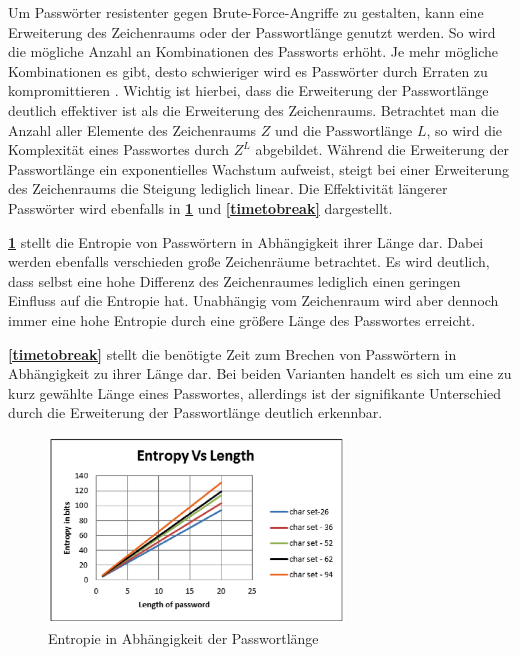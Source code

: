     Um Passwörter resistenter gegen Brute-Force-Angriffe zu gestalten, kann eine Erweiterung des Zeichenraums oder der Passwortlänge genutzt werden. So wird die mögliche Anzahl an Kombinationen des Passworts erhöht. Je mehr mögliche Kombinationen es gibt, desto schwieriger wird es Passwörter durch Erraten zu kompromittieren \cite{chanda2016password}. Wichtig ist hierbei, dass die Erweiterung der Passwortlänge deutlich effektiver ist als die Erweiterung des Zeichenraums. Betrachtet man die Anzahl aller Elemente des Zeichenraums $Z$ und die Passwortlänge $L$, so wird die Komplexität eines Passwortes durch $Z^L$ abgebildet. Während die Erweiterung der Passwortlänge ein exponentielles Wachstum aufweist, steigt bei einer Erweiterung des Zeichenraums die Steigung lediglich linear. Die Effektivität längerer Passwörter wird ebenfalls in \textbf{\ref{EntropyvsLength}} und \textbf{\ref{timetobreak}} dargestellt. 

    \textbf{\ref{EntropyvsLength}} stellt die Entropie von Passwörtern in Abhängigkeit ihrer Länge dar. Dabei werden ebenfalls verschieden große Zeichenräume betrachtet. Es wird deutlich, dass selbst eine hohe Differenz des Zeichenraumes lediglich einen geringen Einfluss auf die Entropie hat. Unabhängig vom Zeichenraum wird aber dennoch immer eine hohe Entropie durch eine größere Länge des Passwortes erreicht. 
    
    \textbf{\ref{timetobreak}} stellt die benötigte Zeit zum Brechen von Passwörtern in Abhängigkeit zu ihrer Länge dar. Bei beiden Varianten handelt es sich um eine zu kurz gewählte Länge eines Passwortes, allerdings ist der signifikante Unterschied durch die Erweiterung der Passwortlänge  deutlich erkennbar.

    \begin{figure}[h]
        \centering 
        \includegraphics[width=0.7\textwidth]{img/abbildungen/entropy-length.png}
        \captionsetup{format=hang}
        \caption{Entropie in Abhängigkeit der Passwortlänge \cite{chanda2016password}} \label{EntropyvsLength}
    \end{figure}
    
